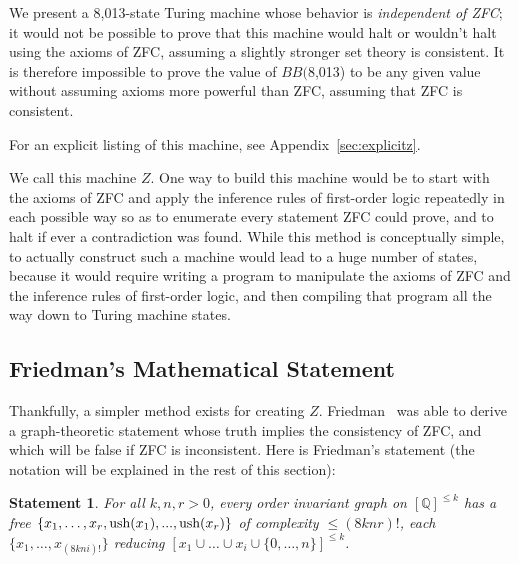 \documentclass[11pt]{article}
\newtheorem{statement}{Statement}
\newcommand{\statenumstate}{8,013-state }
\newcommand{\bbstatenum}{$BB($8,013) }
\begin{document}
We present a \statenumstate Turing machine whose behavior is \emph{independent of ZFC}; it would not be possible to prove that this machine would halt or wouldn't halt using the axioms of ZFC, assuming a slightly stronger set theory is consistent. It is therefore impossible to prove the value of \bbstatenum to be any given value without assuming axioms more powerful than ZFC, assuming that ZFC is consistent.

For an explicit listing of this machine, see Appendix~\ref{sec:explicitz}. 

We call this machine $Z$. One way to build this machine would be to start with the axioms of ZFC and apply the inference rules of first-order logic repeatedly in each possible way so as to enumerate every statement ZFC could prove, and to halt if ever a contradiction was found. While this method is conceptually simple, to actually construct such a machine would lead to a huge number of states, because it would require writing a program to manipulate the axioms of ZFC and the inference rules of first-order logic, and then compiling that program all the way down to Turing machine states. 

\subsection{Friedman's Mathematical Statement} \label{sec:friedmanstate}

Thankfully, a simpler method exists for creating $Z$. Friedman~\cite{friedman}
was able to derive a graph-theoretic statement whose truth implies the consistency of ZFC, and which will be false if ZFC is inconsistent.\footnotemark
{}
Here is Friedman's statement (the notation will be explained in the rest of this section): 

\begin{statement} \label{eq:friedman}
For all $k, n, r > 0$, every order invariant graph on $[\mathbb{Q}]^{\le k}$ has a free $\{x_1,\dots,x_r, \\
\textrm{ush}(x_1),...,\textrm{ush}(x_r)\}$ of complexity $\le (8knr)!$, each $\{x_1, \dots, x_{(8kni)!}\}$
reducing $[x_1 \cup \dots \cup x_i \cup \{0,\dots,n\}]^{\le k}$. \cite{friedman}
\end{statement}
\end{document}
